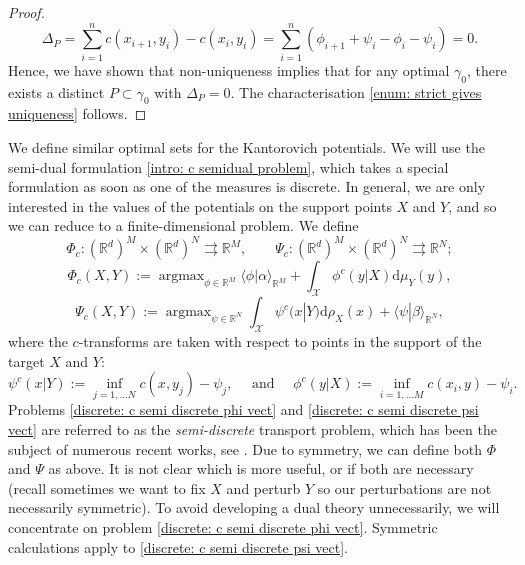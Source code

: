 \documentclass[11pt, oneside, titlepage]{book}
\theoremstyle{plain}
\theoremstyle{definition}
\newcommand{\R}{\mathbb{R}}
\newcommand{\X}{\mathcal{X}}
\newcommand{\di}{\mathrm{d}}
\DeclareMathOperator*{\argmax}{arg\max}
\begin{document}
\begin{proof}
    \begin{equation*}
        \Delta_P=\sum_{i=1}^n c(x_{i+1}, y_i) - c(x_i, y_i) = \sum_{i=1}^n (\phi_{i+1} + \psi_i - \phi_i - \psi_i) = 0.
    \end{equation*}
    Hence, we have shown that non-uniqueness implies that for any optimal $\gamma_0$, there exists a distinct $P \subset \gamma_0$ with $\Delta_P = 0$. The characterisation \eqref{enum: strict gives uniqueness} follows.
\end{proof}

We define similar optimal sets for the Kantorovich potentials. We will use the semi-dual formulation \eqref{intro: c semidual problem}, which takes a special formulation as soon as one of the measures is discrete. In general, we are only interested in the values of the potentials on the support points $X$ and $Y$,  and so we can reduce to a finite-dimensional problem. We define
\begin{equation*}
        \Phi_c : (\R^d)^M \times (\R^d)^N \rightrightarrows \R^M, \quad \quad \Psi_c : (\R^d)^M \times (\R^d)^N \rightrightarrows \R^N; 
 \end{equation*}
\begin{equation}
\label{discrete: c semi discrete phi vect}
    \Phi_c(X, Y) := \argmax_{\phi \in \R^M}  \langle \phi | \alpha \rangle_{\R^M} + \int_\X \phi^c(y | X) \di \mu_Y(y),
\end{equation}
\begin{equation}
\label{discrete: c semi discrete psi vect}
    \Psi_c(X, Y) := \argmax_{\psi \in \R^N} \int_\X \psi^c(x |Y) \di \rho_{X}(x) + \langle \psi | \beta\rangle_{\R^N},
\end{equation}
where the $c$-transforms are taken with respect to points in the support of the target $X$ and $Y$:
\begin{equation*}
    \psi^c(x |Y) := \inf_{j=1,...N} c(x, y_j) - \psi_j, \quad \text{ and } \quad \phi^c(y |X) := \inf_{i=1,...M} c(x_i, y) - \psi_i.
\end{equation*}
Problems \eqref{discrete: c semi discrete phi vect} and \eqref{discrete: c semi discrete psi vect} are referred to as the \textit{semi-discrete} transport problem, which has been the subject of numerous recent works, see \cite{kitagawa2019convergence,levy2015numerical, gallouet2018lagrangian,merigot2011multiscale}.
 Due to symmetry, we can define both $\Phi$ and $\Psi$ as above. It is not clear which is more useful, or if both are necessary (recall sometimes we want to fix $X$ and perturb $Y$ so our perturbations are not necessarily symmetric). To avoid developing a dual theory unnecessarily, we will concentrate on problem \eqref{discrete: c semi discrete phi vect}. Symmetric calculations apply to \eqref{discrete: c semi discrete psi vect}.
 
\end{document}
